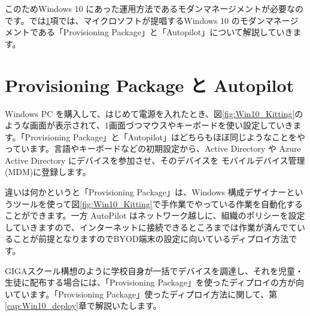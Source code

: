 このためWindows 10 にあった運用方法であるモダンマネージメントが必要なのです。では\ref{sec:ProvisioningPackage}項では、マイクロソフトが提唱するWindows 10 のモダンマネージメントである「Provisioning Package」と「Autopilot」について解説していきます。


\section{Provisioning Package と Autopilot}
\label{sec:ProvisioningPackage}

Windows PC を購入して、はじめて電源を入れたとき、図\ref{fig:Win10_Kitting}のような画面が表示されて、1画面づつマウスやキーボードを使い設定していきます。「Provisioning Package」と「Autopilot」はどちらもほぼ同じようなことをやっています。言語やキーボードなどの初期設定から、Active Directory や Azure Active Directory にデバイスを参加させ、そのデバイスを モバイルデバイス管理(MDM)に登録します。

違いは何かというと「Provisioning Package」は、Windows 構成デザイナーというツールを使って図\ref{fig:Win10_Kitting}で手作業でやっている作業を自動化することができます。一方 AutoPilot はネットワーク越しに、組織のポリシーを設定していきますので、インターネットに接続できるところまでは作業が済んでていることが前提となりますのでBYOD端末の設定に向いているディプロイ方法です。

GIGAスクール構想のように学校自身が一括でデバイスを調達し、それを児童・生徒に配布する場合には、「Provisioning Package」を使ったディプロイの方が向いています。「Provisioning Package」使ったディプロイ方法に関して、第\ref{cap:Win10_deploy}章で解説いたします。

